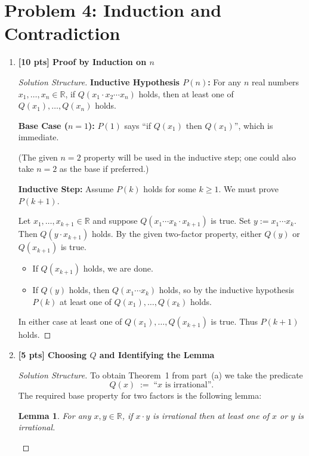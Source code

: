 \documentclass[11pt]{article}
\newtheorem*{lemma*}{Lemma}
\begin{document}
\newpage
\section*{Problem 4: Induction and Contradiction}
\begin{enumerate}
    \item[(a)] \textbf{[10 pts] Proof by Induction on $n$}
    \begin{proof}[Solution Structure]
        \textbf{Inductive Hypothesis $P(n)$:}  
        For any $n$ real numbers $x_1,\dots,x_n \in \mathbb{R}$,  
        if $Q(x_1 \cdot x_2 \cdots x_n)$ holds, then at least one of 
        $Q(x_1),\dots,Q(x_n)$ holds.
        
        \textbf{Base Case ($n=1$):}  
        $P(1)$ says ``if $Q(x_1)$ then $Q(x_1)$'', which is immediate.
        
        (The given $n=2$ property will be used in the inductive step; 
        one could also take $n=2$ as the base if preferred.)
        
        \textbf{Inductive Step:}  
        Assume $P(k)$ holds for some $k \ge 1$.  We must prove $P(k+1)$.
        
        Let $x_1,\dots,x_{k+1} \in \mathbb{R}$ and suppose 
        $Q(x_1 \cdots x_k \cdot x_{k+1})$ is true.  
        Set $y := x_1 \cdots x_k$.  Then $Q(y \cdot x_{k+1})$ holds.
        By the given two-factor property, either $Q(y)$ or $Q(x_{k+1})$ is true.
        \begin{itemize}
            \item If $Q(x_{k+1})$ holds, we are done.
            \item If $Q(y)$ holds, then $Q(x_1 \cdots x_k)$ holds, so by the 
                  inductive hypothesis $P(k)$ at least one of $Q(x_1),\dots,Q(x_k)$ holds.
        \end{itemize}
        In either case at least one of $Q(x_1),\dots,Q(x_{k+1})$ is true.  
        Thus $P(k+1)$ holds.
    \end{proof}

    \item[(b)] \textbf{[5 pts] Choosing $Q$ and Identifying the Lemma}
    \begin{proof}[Solution Structure]
        To obtain Theorem~1 from part~(a) we take the predicate
        \[
            Q(x) \;:=\; \text{``$x$ is irrational''}.
        \]
        The required base property for two factors is the following lemma:
        \begin{lemma*}
        For any $x,y \in \mathbb{R}$, if $x\cdot y$ is irrational then at least one of 
        $x$ or $y$ is irrational.
        \end{lemma*}
    \end{proof}


\end{enumerate}
\end{document}

